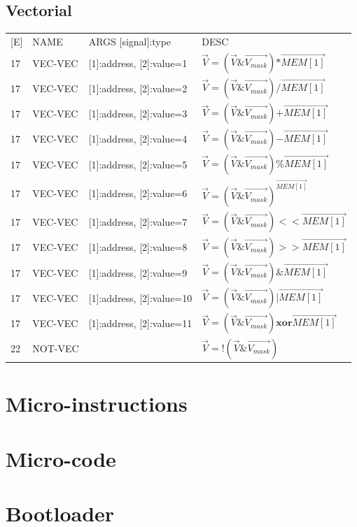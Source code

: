 \documentclass{scrreprt}
\begin{document}
	\section{Vectorial}
	\begin{tabular}{l | l | l  l}
		[E] & NAME & ARGS [signal]:type & DESC \\
		17 & VEC-VEC & [1]:address, [2]:value=1 & $\vec{V} = (\vec{V}\&\vec{V_{mask}}) \mathbf{*} \vec{MEM[1]}$\\  
		17 & VEC-VEC & [1]:address, [2]:value=2 & $\vec{V} = (\vec{V}\&\vec{V_{mask}}) \mathbf{/} \vec{MEM[1]}$\\  
		17 & VEC-VEC & [1]:address, [2]:value=3 & $\vec{V} = (\vec{V}\&\vec{V_{mask}}) \mathbf{+} \vec{MEM[1]}$\\  
		17 & VEC-VEC & [1]:address, [2]:value=4 & $\vec{V} = (\vec{V}\&\vec{V_{mask}}) \mathbf{-} \vec{MEM[1]}$\\  
		17 & VEC-VEC & [1]:address, [2]:value=5 & $\vec{V} = (\vec{V}\&\vec{V_{mask}}) \mathbf{\%} \vec{MEM[1]}$\\  
		17 & VEC-VEC & [1]:address, [2]:value=6 & $\vec{V} = (\vec{V}\&\vec{V_{mask}})^{\vec{MEM[1]}}$\\  
		17 & VEC-VEC & [1]:address, [2]:value=7 & $\vec{V} = (\vec{V}\&\vec{V_{mask}}) \mathbf{<<}\vec{MEM[1]}$\\  
		17 & VEC-VEC & [1]:address, [2]:value=8 & $\vec{V} = (\vec{V}\&\vec{V_{mask}}) \mathbf{>>}\vec{MEM[1]}$\\  
		17 & VEC-VEC & [1]:address, [2]:value=9 & $\vec{V} = (\vec{V}\&\vec{V_{mask}}) \mathbf{\&}\vec{MEM[1]}$\\  
		17 & VEC-VEC & [1]:address, [2]:value=10 &$\vec{V} = (\vec{V}\&\vec{V_{mask}}) \mathbf{|}\vec{MEM[1]}$\\  
		17 & VEC-VEC & [1]:address, [2]:value=11 & $\vec{V} = (\vec{V}\&\vec{V_{mask}})  \mathbf{xor}\vec{MEM[1]}$\\  
		22 & NOT-VEC & & $\vec{V} = !(\vec{V}\&\vec{V_{mask}})$\\ 
	\end{tabular}
	\chapter{Micro-instructions}
	
	
	
	\chapter{Micro-code}
	\chapter{Bootloader}
	
\end{document}
